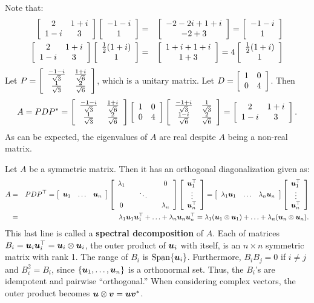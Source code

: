 \begin{Exam}
Note that:
\begin{eqnarray*}
\mtx{cc}{2 & 1+i \\ 1-i & 3}\mtx{c}{-1-i \\ 1} &=& \mtx{c}{-2-2i+1+i \\ -2+3} = \mtx{c}{-1-i \\ 1}\\
\mtx{cc}{2 & 1+i \\ 1-i & 3}\mtx{c}{\frac{1}{2}(1+i) \\ 1} &=& \mtx{c}{1+i + 1+i  \\ 1 +3} = 4\mtx{c}{\frac{1}{2}(1+i) \\ 1}
\end{eqnarray*}
Let $P = \mtx{cc}{\frac{-1-i}{\sqrt{3}} & \frac{1+i}{\sqrt{6}} \\ \frac{1}{\sqrt{3}} & \frac{2}{\sqrt{6}}}$, which is a unitary matrix. Let $D = \mtx{cc}{1 & 0 \\ 0 & 4}$. Then 
\[A = PDP^* = \mtx{cc}{\frac{-1-i}{\sqrt{3}} & \frac{1+i}{\sqrt{6}} \\ \frac{1}{\sqrt{3}} & \frac{2}{\sqrt{6}}}\mtx{cc}{1 & 0 \\ 0 & 4}\mtx{cc}{\frac{-1+i}{\sqrt{3}} & \frac{1}{\sqrt{3}} \\ \frac{1-i}{\sqrt{6}} & \frac{2}{\sqrt{6}}} = \mtx{cc}{2 & 1+i \\ 1-i & 3}.\]
As can be expected, the eigenvalues of $A$ are real despite $A$ being a non-real matrix.
\end{Exam}\vs

Let $A$ be a symmetric matrix. Then it has an orthogonal diagonalization given as:
\begin{eqnarray*}
A &=& PDP^\top  = \mtx{ccc}{\bb u_1 & \ldots & \bb u_n}\mtx{ccccc}{\lambda_1 &  & & & 0\\& & \ddots & & \\0 &  & & & \lambda_n}\mtx{c}{\bb u_1^\top \\\vdots \\ \bb u_n^\top } = \mtx{ccc}{\lambda_1\bb u_1 & \ldots & \lambda_n\bb u_n}\mtx{c}{\bb u_1^\top \\\vdots \\ \bb u_n^\top }\\
&=& \lambda_1\bb u_1\bb u_1^\top  + \ldots + \lambda_n\bb u_n\bb u_n^\top  = \lambda_1(\bb u_1 \otimes \bb u_1) + \ldots + \lambda_n(\bb u_n \otimes \bb u_n).
\end{eqnarray*} This last line is called a \textbf{spectral decomposition} of $A$. Each of matrices $B_i = \bb u_i\bb u_i^\top  = \bb u_i \otimes \bb u_i$, the outer product of $\bb u_i$ with itself,  is an $n\times n$ symmetric matrix with rank 1. The range of $B_i$ is $\Span\{\bb u_i\}$. Furthermore, $B_iB_j = 0$ if $i\neq j$ and $B_i^2 = B_i$, since $\{\bb u_1, \ldots, \bb u_n\}$ is a orthonormal set. Thus, the $B_i$'s  are idempotent and pairwise ``orthogonal.'' When considering complex vectors, the outer product becomes $\bb u \otimes \bb v = \bb u \bb v^*$.\\

